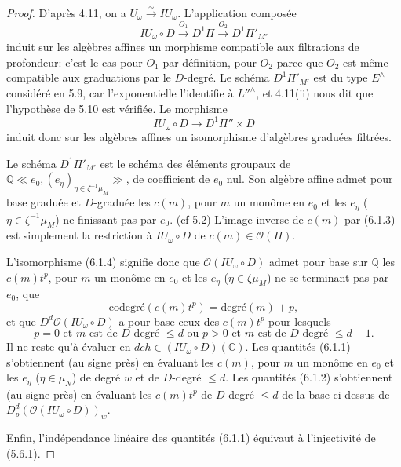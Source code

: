 \documentclass[11pt,a4paper]{article}
\theoremstyle{plain}
\theoremstyle{definition}
\newcommand{\dch}{\mathit{dch}}
\newcommand{\Q}{\mathbb{Q}}
\newcommand{\C}{\mathbb{C}}
\begin{document}
\begin{proof}
D'apr\`es 4.11, on a $U_\omega \xrightarrow{\sim} IU_\omega$. L'application compos\'ee
\begin{equation}\label{eq:6.1.3}
IU_\omega \circ D \xrightarrow{O_1} D^1\Pi \xrightarrow{O_2} D^1\Pi'_{M'}
\end{equation}
induit sur les alg\`ebres affines un morphisme compatible aux filtrations de profondeur: c'est le cas pour $O_1$ par d\'efinition, pour $O_2$ parce que $O_2$ est m\^eme compatible aux graduations par le $D$-degr\'e. Le sch\'ema $D^1\Pi'_{M'}$ est du type $E^{\wedge}$ consid\'er\'e en 5.9, car l'exponentielle l'identifie \`a $L''^{\wedge}$, et 4.11(ii) nous dit que l'hypoth\`ese de 5.10 est v\'erifi\'ee. Le morphisme
\begin{equation}\label{eq:6.1.4}
IU_\omega \circ D \to D^1\Pi'' \times D
\end{equation}
induit donc sur les alg\`ebres affines un isomorphisme d'alg\`ebres gradu\'ees filtr\'ees.

Le sch\'ema $D^1\Pi'_{M'}$ est le sch\'ema des \'el\'ements groupaux de $\Q \ll e_0, (e_\eta)_{\eta \in \zeta^{-1}\mu_M} \gg$, de coefficient de $e_0$ nul. Son alg\`ebre affine admet pour base gradu\'ee et $D$-gradu\'ee les $c(m)$, pour $m$ un mon\^ome en $e_0$ et les $e_\eta$ ($\eta \in \zeta^{-1}\mu_M$) ne finissant pas par $e_0$. (cf 5.2) L'image inverse de $c(m)$ par (6.1.3) est simplement la restriction \`a $IU_\omega \circ D$ de $c(m) \in \mathcal{O}(\Pi)$.

L'isomorphisme (6.1.4) signifie donc que $\mathcal{O}(IU_\omega \circ D)$ admet pour base sur $\Q$ les $c(m)t^p$, pour $m$ un mon\^ome en $e_0$ et les $e_\eta$ ($\eta \in \zeta \mu_M$) ne se terminant pas par $e_0$, que
\[
\text{codegr\'e}(c(m)t^p) = \text{degr\'e}(m) + p,
\]
et que $D^d \mathcal{O}(IU_\omega \circ D)$ a pour base ceux des $c(m)t^p$ pour lesquels
\[
p=0 \text{ et } m \text{ est de } D\text{-degr\'e } \leq d \text{ ou } p > 0 \text{ et } m \text{ est de } D\text{-degr\'e } \leq d-1.
\]
Il ne reste qu'\`a \'evaluer en $\dch \in (IU_\omega \circ D)(\C)$. Les quantit\'es (6.1.1) s'obtiennent (au signe pr\`es) en \'evaluant les $c(m)$, pour $m$ un mon\^ome en $e_0$ et les $e_\eta$ ($\eta \in \mu_N$) de degr\'e $w$ et de $D$-degr\'e $\leq d$. Les quantit\'es (6.1.2) s'obtiennent (au signe pr\`es) en \'evaluant les $c(m)t^p$ de $D$-degr\'e $\leq d$ de la base ci-dessus de $D^d_p(\mathcal{O}(IU_\omega \circ D))_w$.

Enfin, l'ind\'ependance lin\'eaire des quantit\'es (6.1.1) \'equivaut \`a l'injectivit\'e de (5.6.1).
\end{proof}
\end{document}
